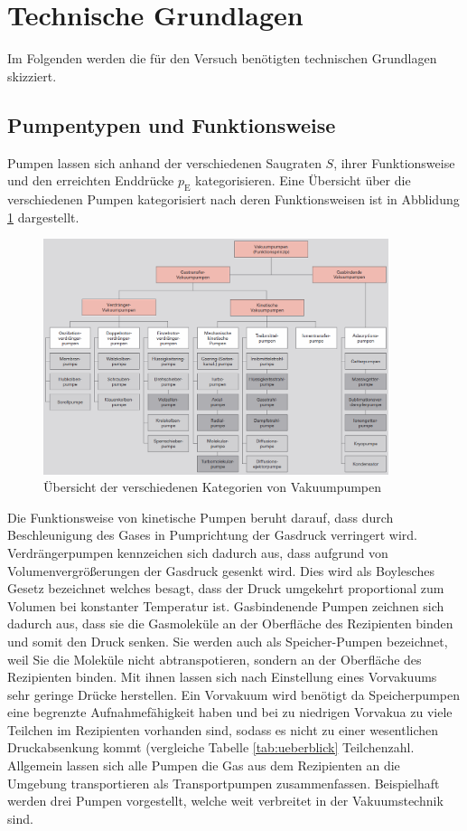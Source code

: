 \section{Technische Grundlagen}
Im Folgenden werden die für den Versuch benötigten technischen Grundlagen skizziert.
\subsection{Pumpentypen und Funktionsweise}
Pumpen lassen sich anhand der verschiedenen Saugraten $S$, ihrer Funktionsweise und den erreichten Enddrücke $p_\text{E}$ kategorisieren. Eine Übersicht über die verschiedenen Pumpen kategorisiert nach deren Funktionsweisen ist in Abblidung \ref{fig:Uebersicht} dargestellt.
\begin{figure}[htbp]
  \centering
  \includegraphics[width=0.9\textwidth]{picture/Uebersicht.png}
  \caption{Übersicht der verschiedenen Kategorien von Vakuumpumpen \cite{Uebersicht}}
  \label{fig:Uebersicht}
\end{figure}
Die Funktionsweise von kinetische Pumpen beruht darauf, dass durch Beschleunigung des Gases in Pumprichtung der Gasdruck verringert wird.
Verdrängerpumpen kennzeichen sich dadurch aus, dass aufgrund von Volumenvergrößerungen der Gasdruck gesenkt wird. Dies wird als Boylesches Gesetz bezeichnet welches besagt, dass der Druck umgekehrt proportional zum Volumen bei konstanter Temperatur ist. 
Gasbindenende Pumpen zeichnen sich dadurch aus, dass sie die Gasmoleküle an der Oberfläche des Rezipienten binden und somit den Druck senken. Sie werden auch als Speicher-Pumpen bezeichnet, weil Sie die Moleküle nicht abtranspotieren, sondern an der Oberfläche des Rezipienten binden. Mit ihnen lassen sich nach Einstellung eines Vorvakuums sehr geringe Drücke herstellen. Ein Vorvakuum wird benötigt da Speicherpumpen eine begrenzte Aufnahmefähigkeit haben und bei zu niedrigen Vorvakua zu viele Teilchen im Rezipienten vorhanden sind, sodass es nicht zu einer wesentlichen Druckabsenkung kommt (vergleiche Tabelle \ref{tab:ueberblick} Teilchenzahl. 
Allgemein lassen sich alle Pumpen die Gas aus dem Rezipienten an die Umgebung transportieren als Transportpumpen zusammenfassen.
Beispielhaft werden drei Pumpen vorgestellt, welche weit verbreitet in der Vakuumstechnik sind.
